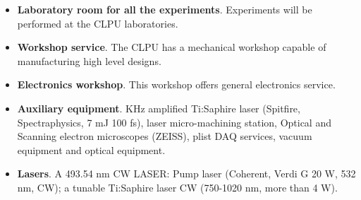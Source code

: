  \begin{itemize}
    \item \textbf{Laboratory room for all the experiments}. Experiments will be performed at the CLPU laboratories.
    
\item \textbf{Workshop service}. The CLPU has a mechanical workshop capable of manufacturing high level designs. 

\item \textbf{Electronics workshop}. This workshop offers general electronics service. 

\item \textbf{Auxiliary equipment}. KHz amplified Ti:Saphire laser (Spitfire, Spectraphysics, 7 mJ 100 fs), laser micro-machining station, Optical and Scanning electron microscopes (ZEISS), plist DAQ services, vacuum equipment and optical equipment.   

%
%
%

\item \textbf{Lasers}. A 493.54 nm CW LASER: Pump laser (Coherent, Verdi G 20 W, 532 nm, CW); a tunable Ti:Saphire laser CW (750-1020 nm, more than 4 W).
%
%

\end{itemize}



